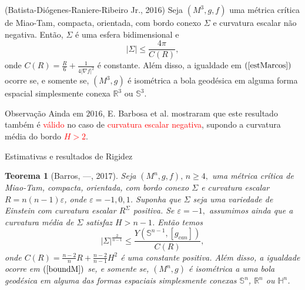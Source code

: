 \documentclass[blue]{beamer}
\newtheorem{thm}{Teorema}
\begin{document}
\begin{frame}
\begin{block}{(Batista-Diógenes-Raniere-Ribeiro Jr., 2016)}
Seja $(M^3, g, f)$ uma métrica crítica de Miao-Tam, compacta, orientada, com bordo conexo $\Sigma$ e curvatura escalar não negativa. Então, $\Sigma$ é uma esfera bidimensional e 
\begin{equation}\label{estMarcos}
|\Sigma|\leq \frac{4\pi}{C(R)},
\end{equation}
onde $C(R)= \frac{R}{6} +\frac{1}{4|\nabla f|^2}$ é constante. Além disso, a igualdade em $(\ref{estMarcos})$ ocorre se, e somente se, $(M^3, g)$ é isométrica a bola geodésica em alguma forma espacial simplesmente conexa $\mathbb{R}^3$ ou $\mathbb{S}^3$.
\end{block}\pause

\begin{block}{Observação}
Ainda em $2016$, E. Barbosa et al. mostraram que este resultado
 também é \textcolor{red}{válido} no caso de \textcolor{red}{curvatura escalar negativa}, supondo a curvatura média do bordo \textcolor{red}{$H>2$}.
\end{block}

\end{frame}


\begin{frame}{Estimativas e resultados de Rigidez}
\begin{thm}[Barros, ---, 2017]
	Seja $(M^n, g, f), \,n\geq 4,$ uma métrica crítica de Miao-Tam, compacta, orientada, com bordo conexo $\Sigma$ e curvatura escalar $R=n(n-1)\varepsilon $, onde $\varepsilon = -1, 0, 1$. Suponha que $\Sigma$ seja uma variedade de Einstein com curvatura escalar $R^{\Sigma}$ positiva. Se $\varepsilon = -1,$ assumimos ainda que a curvatura média de $\Sigma$ satisfaz $H> n-1$. Então temos
	\begin{equation}\label{boundM}
	|\Sigma|^{\frac{2}{n-1}} \leq \frac{Y(\mathbb{S}^{n-1}, [g_{can}])}{C(R)},
	\end{equation}
	onde $C(R)=\frac{n-2}{n}R+\frac{n-2}{n-1}H^{2}$ é uma constante positiva. Além disso, a igualdade ocorre em $(\ref{boundM})$ se, e somente se, $(M^n, g)$ é isométrica a uma bola geodésica em alguma das formas espaciais simplesmente conexas $\mathbb{S}^n$, $\mathbb{R}^{n}$ ou $\mathbb{H}^n$.
\end{thm}
\end{frame}
\end{document}
